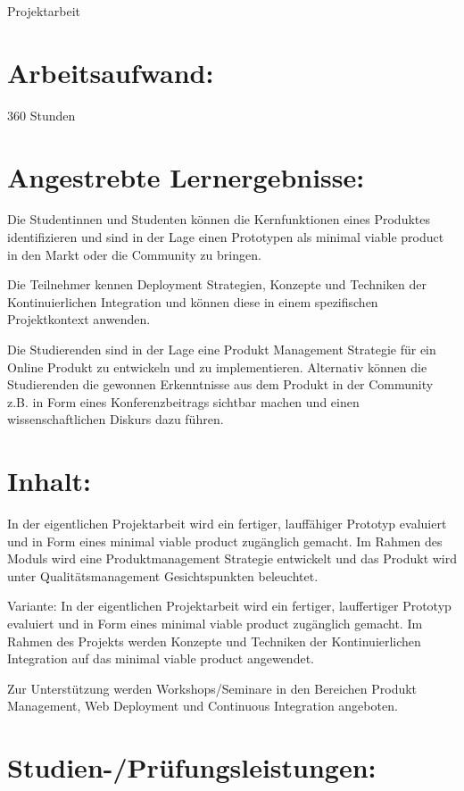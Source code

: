 Projektarbeit

\section*{Arbeitsaufwand:}\label{arbeitsaufwand-15}

360 Stunden

\section*{Angestrebte
Lernergebnisse:}\label{angestrebte-lernergebnisse-9}

Die Studentinnen und Studenten können die Kernfunktionen eines Produktes
identifizieren und sind in der Lage einen Prototypen als minimal viable
product in den Markt oder die Community zu bringen.

Die Teilnehmer kennen Deployment Strategien, Konzepte und Techniken der
Kontinuierlichen Integration und können diese in einem spezifischen
Projektkontext anwenden.

Die Studierenden sind in der Lage eine Produkt Management Strategie für
ein Online Produkt zu entwickeln und zu implementieren. Alternativ
können die Studierenden die gewonnen Erkenntnisse aus dem Produkt in der
Community z.B. in Form eines Konferenzbeitrags sichtbar machen und einen
wissenschaftlichen Diskurs dazu führen.

\section*{Inhalt:}\label{inhalt-9}

In der eigentlichen Projektarbeit wird ein fertiger, lauffähiger
Prototyp evaluiert und in Form eines minimal viable product zugänglich
gemacht. Im Rahmen des Moduls wird eine Produktmanagement Strategie
entwickelt und das Produkt wird unter Qualitätsmanagement
Gesichtspunkten beleuchtet.

Variante: In der eigentlichen Projektarbeit wird ein fertiger,
lauffertiger Prototyp evaluiert und in Form eines minimal viable product
zugänglich gemacht. Im Rahmen des Projekts werden Konzepte und Techniken
der Kontinuierlichen Integration auf das minimal viable product
angewendet.

Zur Unterstützung werden Workshops/Seminare in den Bereichen Produkt
Management, Web Deployment und Continuous Integration angeboten.

\section*{Studien-/Prüfungsleistungen:}\label{studien-pruxfcfungsleistungen-9}

